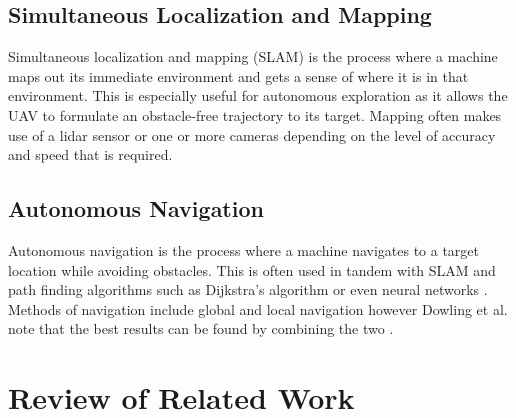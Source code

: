 \documentclass[english]{upeeei}
\begin{document}
\section{Simultaneous Localization and Mapping}
Simultaneous localization and mapping (SLAM) is the process where a machine maps out its immediate environment and gets
a sense of where it is in that environment. This is especially useful for autonomous exploration as it allows the UAV to
formulate an obstacle-free trajectory to its target. Mapping often makes use of a lidar sensor
\cite{Dowling2018} or one or more cameras\cite{OrbSlam2} depending on the level of accuracy and speed that is required. 
\section{Autonomous Navigation}
Autonomous navigation is the process where a machine navigates to a target location while avoiding obstacles. This is
often used in tandem with SLAM and path finding algorithms such as Dijkstra's algorithm or even neural networks 
\cite{Dowling2018}. Methods of navigation include global and local navigation however Dowling et al. note that the
best results can be found by combining the two \cite{Dowling2018}.

\chapter{Review of Related Work}
\end{document}
